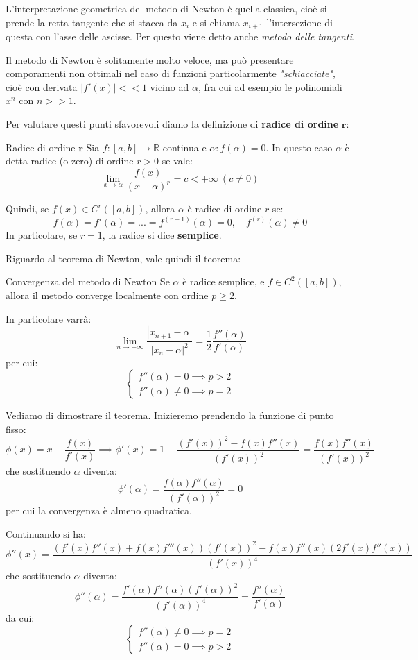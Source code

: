 \documentclass[a4paper,11pt]{article}
\begin{document}
L'interpretazione geometrica del metodo di Newton è quella classica, cioè si prende la retta tangente che si stacca da $x_i$ e si chiama $x_{i + 1}$ l'intersezione di questa con l'asse delle ascisse. 
Per questo viene detto anche \textit{metodo delle tangenti}.

Il metodo di Newton è solitamente molto veloce, ma può presentare comporamenti non ottimali nel caso di funzioni particolarmente \textit{"schiacciate"}, cioè con derivata $|f'(x)| << 1$ vicino ad $\alpha$, fra cui ad esempio le polinomiali $x^n$ con $n >> 1$.

Per valutare questi punti sfavorevoli diamo la definizione di \textbf{radice di ordine} $\mathbf{r}$:
\begin{definition}{Radice di ordine $\mathbf{r}$}
	Sia $f : [a, b] \rightarrow \mathbb{R}$ continua e $\alpha : f(\alpha) = 0$.
	In questo caso $\alpha$ è detta radice (o zero) di ordine $r > 0$ se vale:
	$$
		\lim_{x \rightarrow \alpha} \frac{f(x)}{(x - \alpha)^r} = c < + \infty \ (c \neq 0)
	$$
\end{definition}
Quindi, se $f(x) \in C^r([a, b])$, allora $\alpha$ è radice di ordine $r$ se:
$$
f(\alpha) = f'(\alpha) = ... = f^{(r - 1)}(\alpha) = 0, \quad f^{(r)} (\alpha) \neq 0
$$
In particolare, se $r = 1$, la radice si dice \textbf{semplice}.

Riguardo al teorema di Newton, vale quindi il teorema:
\begin{theorem}{Convergenza del metodo di Newton}
	Se $\alpha$ è radice semplice, e $f \in C^2([a, b])$, allora il metodo converge localmente con ordine $p \geq 2$.
\end{theorem}
In particolare varrà:
$$
	\lim_{n \rightarrow +\infty} \frac{|x_{n + 1} - \alpha|}{|x_n - \alpha|^2} = \frac{1}{2} \frac{f''(\alpha)}{f'(\alpha)}
$$
per cui:
\[
	\begin{cases}
		f''(\alpha) = 0 \implies p > 2 \\
		f''(\alpha) \neq 0 \implies p = 2
	\end{cases}
\]

Vediamo di dimostrare il teorema.
Inizieremo prendendo la funzione di punto fisso:
$$
\phi(x) = x - \frac{f(x)}{f'(x)} \implies \phi'(x) = 1 - \frac{(f'(x))^2 - f (x) f''(x)}{(f'(x))^2} = \frac{f(x) f''(x)}{(f'(x))^2}
$$
che sostituendo $\alpha$ diventa:
$$
\phi'(\alpha) = \frac{f(\alpha) f''(\alpha)}{(f'(\alpha))^2} = 0
$$
per cui la convergenza è almeno quadratica.

Continuando si ha:
$$
\phi''(x) = \frac{( f'(x) f''(x) + f(x) f'''(x) ) (f'(x))^2 - f(x) f''(x) ( 2f'(x) f''(x) ) }{(f'(x))^4}
$$
che sostituendo $\alpha$ diventa:
$$
\phi''(\alpha) = \frac{f'(\alpha) f''(\alpha) \left( f'(\alpha) \right)^2 }{ ( f'(\alpha) )^4 } = \frac{f''(\alpha)}{f'(\alpha)}
$$
da cui:
\[
	\begin{cases}
		f''(\alpha) \neq 0 \implies p = 2 \\
		f''(\alpha) = 0 \implies p > 2
	\end{cases}
\]
\end{document}
